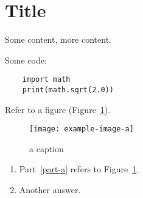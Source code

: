 \documentclass[]{article}
\begin{document}
% 
	
\begin{comment}
I like to start with a block comment outline of what I will write about
\end{comment}
	
	
\section*{Title}
Some content, more content.

Some code:
\begin{verbatim}	
	import math
	print(math.sqrt(2.0))
\end{verbatim}

Refer to a figure (Figure~\ref{fig:1}).
\begin{figure}[h]
		\centering
		\texttt{[image: example-image-a]}
		\caption{a caption}
		\label{fig:1}
\end{figure}

\begin{enumerate}[label=(\alph*)]
	\item\label{part-a}
	
	Part~\ref{part-a} refers to Figure~\ref{fig:1}.
	
	
	
	
	
	
	\newpage
	\item\label{part-b}
	Another answer.
\end{enumerate}


\end{document}
